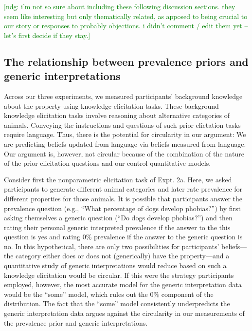 \documentclass[,man,floatsintext]{apa6}
\theoremstyle{definition}
\theoremstyle{definition}
\theoremstyle{definition}
\theoremstyle{remark}
\begin{document}
{\textcolor{Green}{[ndg: i'm not so sure about including these following discussion sections. they seem like interesting but only thematically related, as apposed to being crucial to our story or responses to probably objections. i didn't comment / edit them yet -- let's first decide if they stay.]}}

\hypertarget{the-relationship-between-prevalence-priors-and-generic-interpretations}{%
\subsection{The relationship between prevalence priors and generic
interpretations}\label{the-relationship-between-prevalence-priors-and-generic-interpretations}}

Across our three experiments, we measured participants' background
knowledge about the property using knowledge elicitation tasks. These
background knowledge elicitation tasks involve reasoning about
alternative categories of animals. Conveying the instructions and
questions of such prior elictation tasks require language. Thus, there
is the potential for circularity in our argument: We are predicting
beliefs updated from language via beliefs measured from language. Our
argument is, however, not circular because of the combination of the
nature of the prior elicitation questions and our control quantitative
models.

Consider first the nonparametric elicitation task of Expt. 2a. Here, we
asked participants to generate different animal categories and later
rate prevalence for different properties for those animals. It is
possible that participants answer the prevalence question (e.g.,
\enquote{What percentage of dogs develop phobias?}) by first asking
themselves a generic question (\enquote{Do dogs develop phobias?}) and
then rating their personal generic interpreted prevalence if the answer
to the this question is yes and rating 0\% prevalence if the answer to
the generic question is no. In this hypothetical, there are only two
possibilities for participants' beliefs---the category either does or
does not (generically) have the property---and a quantitative study of
generic interpretations would reduce based on such a knowledge
elicitation would be circular. If this were the strategy participants
employed, however, the most accurate model for the generic
interpretation data would be the \enquote{some} model, which rules out
the 0\% component of the distribution. The fact that the \enquote{some}
model consistently underpredicts the generic interpretation data argues
against the circularity in our measurements of the prevalence prior and
generic interpretations.
\end{document}
